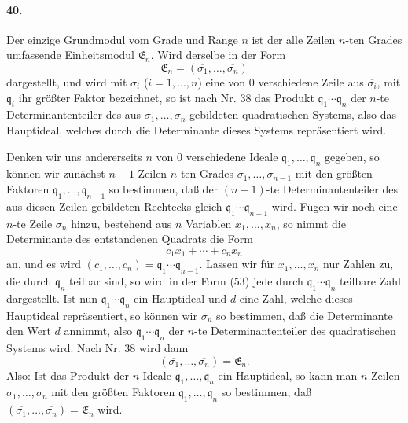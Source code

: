 \documentclass[11pt]{article}
\begin{document}
\paragraph{40.}
Der einzige Grundmodul vom Grade und Range $n$ ist der alle Zeilen $n$-ten Grades umfassende Einheitsmodul $\mathfrak E_n$. Wird derselbe in der Form
\[
\mathfrak E_n=(\overline{\sigma_1},
\ldots,
\overline{\sigma_n})
\]
dargestellt, und wird mit $\sigma_i$ ($i=1,
\ldots,n$) eine von $0$ verschiedene Zeile aus $\overline{\sigma_i}$, mit $\mathfrak q_i$ ihr größter Faktor bezeichnet, so ist nach Nr. 38 das Produkt $\mathfrak q_1\cdots\mathfrak q_n$ der $n$-te Determinantenteiler des aus $\sigma_1,
\ldots,
\sigma_n$ gebildeten quadratischen Systems, also das Hauptideal, welches durch die Determinante dieses Systems repräsentiert wird.

Denken wir uns andererseits $n$ von $0$ verschiedene Ideale $\mathfrak q_1,
\ldots,
\mathfrak q_n$ gegeben, so können wir zunächst $n-1$ Zeilen $n$-ten Grades $\sigma_1,
\ldots,
\sigma_{n-1}$ mit den größten Faktoren $\mathfrak q_1,
\ldots,
\mathfrak q_{n-1}$ so bestimmen, daß der $(n-1)$-te Determinantenteiler des aus diesen Zeilen gebildeten Rechtecks gleich $\mathfrak q_1\cdots\mathfrak q_{n-1}$ wird. Fügen wir noch eine $n$-te Zeile $\sigma_n$ hinzu, bestehend aus $n$ Variablen $x_1,
\ldots,x_n$, so nimmt die Determinante des entstandenen Quadrats die Form
\begin{equation}
 c_1x_1+\cdots+c_nx_n
\tag{53}
\end{equation}
an, und es wird $(c_1,
\ldots,c_n)=\mathfrak q_1\cdots\mathfrak q_{n-1}$. Lassen wir für $x_1,
\ldots,x_n$ nur Zahlen zu, die durch $\mathfrak q_n$ teilbar sind, so wird in der Form (53) jede durch $\mathfrak q_1\cdots\mathfrak q_n$ teilbare Zahl dargestellt. Ist nun $\mathfrak q_1\cdots\mathfrak q_n$ ein Hauptideal und $d$ eine Zahl, welche dieses Hauptideal repräsentiert, so können wir $\sigma_n$ so bestimmen, daß die Determinante den Wert $d$ annimmt, also $\mathfrak q_1\cdots\mathfrak q_n$ der $n$-te Determinantenteiler des quadratischen Systems wird. Nach Nr. 38 wird dann
\[
(\overline{\sigma_1},
\ldots,
\overline{\sigma_n})=\mathfrak E_n.
\]
Also: Ist das Produkt der $n$ Ideale $\mathfrak q_1,
\ldots,
\mathfrak q_n$ ein Hauptideal, so kann man $n$ Zeilen $\sigma_1,
\ldots,
\sigma_n$ mit den größten Faktoren $\mathfrak q_1,
\ldots,
\mathfrak q_n$ so bestimmen, daß $(\overline{\sigma_1},
\ldots,
\overline{\sigma_n})=\mathfrak E_n$ wird.
\end{document}

